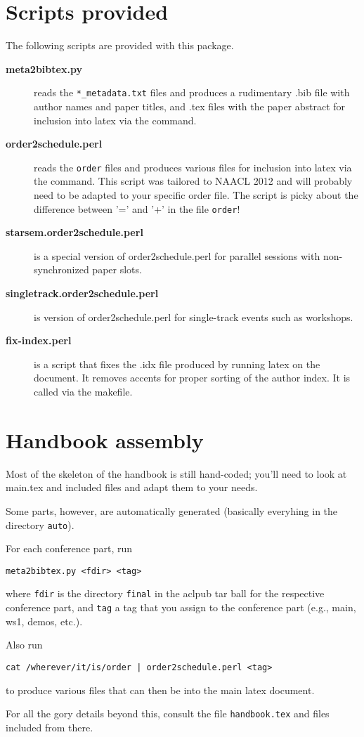 \documentclass{article}
\begin{document}
\section{Scripts provided}
The following scripts are provided with this package.
\begin{description}
\item[{\bfseries meta2bibtex.py}] reads the \verb$*_metadata.txt$
  files and produces a rudimentary .bib file with author names and
  paper titles, and .tex files with the paper abstract for inclusion
  into latex via the \verb$$ command.
\item[{\bfseries order2schedule.perl}] reads the {\tt order} files and
  produces various files for inclusion into latex via the
  \verb$$ command. This script was tailored to NAACL 2012 and
  will probably need to be adapted to your specific order file. The
  script is picky about the difference between '=' and '+' in the file
  {\tt order}!
\item[{\bfseries starsem.order2schedule.perl}] is a special version of
  order2schedule.perl for parallel sessions with non-synchronized
  paper slots.
\item[{\bfseries singletrack.order2schedule.perl}] is version of
  order2schedule.perl for single-track events such as workshops.

\item[{\bfseries fix-index.perl}] is a script that fixes the .idx file
  produced by running latex on the document. It removes accents for
  proper sorting of the author index. It is called via the makefile.
\end{description}

\section{Handbook assembly}
Most of the skeleton of the handbook is still hand-coded; you'll need
to look at main.tex and included files and adapt them to your needs.

Some parts, however, are automatically generated (basically everyhing
in the directory {\tt auto}).

For each conference part, run 

\begin{verbatim}
meta2bibtex.py <fdir> <tag>
\end{verbatim}

where {\tt fdir} is the directory {\tt final} in the aclpub tar ball
for the respective conference part, and {\tt tag} a tag that you
assign to the conference part (e.g., main, ws1, demos, etc.).

Also run 

\begin{verbatim}
cat /wherever/it/is/order | order2schedule.perl <tag>
\end{verbatim}

to produce various files that can then be \verb$$ into the main
latex document.


For all the gory details beyond this, consult the file {\tt handbook.tex}
and files included from there. 
\end{document}
